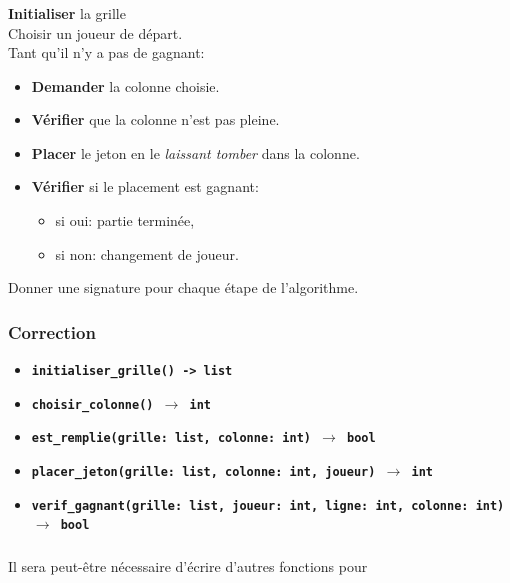 \documentclass[svgnames,11pt]{beamer}
\begin{document}
\begin{frame}
    \frametitle{}
    \textbf{Initialiser} la grille\\
    Choisir un joueur de départ.\\
    Tant qu'il n'y a pas de gagnant:
    \begin{itemize}
        \item \textbf{Demander} la colonne choisie.
        \item \textbf{Vérifier} que la colonne n'est pas pleine.
        \item \textbf{Placer} le jeton en le \emph{laissant tomber} dans la colonne.
        \item \textbf{Vérifier} si le placement est gagnant:
              \begin{itemize}
                  \item si oui: partie terminée,
                  \item si non: changement de joueur.
              \end{itemize}
    \end{itemize}
    \begin{activite}
        Donner une signature pour chaque étape de l'algorithme.
    \end{activite}

\end{frame}
\begin{frame}
    \frametitle{Correction}

    \begin{itemize}
        \item<1-> \textbf{\texttt{initialiser\_grille() -> list}}
        \item<2-> \textbf{\texttt{choisir\_colonne() $\rightarrow$ int}}
        \item<3-> \textbf{\texttt{est\_remplie(grille: list, colonne: int) $\rightarrow$ bool}}
        \item<4-> \textbf{\texttt{placer\_jeton(grille: list, colonne: int, joueur) $\rightarrow$ int}}
        \item<5-> \textbf{\texttt{verif\_gagnant(grille: list, joueur: int, ligne: int, colonne: int) $\rightarrow$ bool}}
    \end{itemize}

\end{frame}
\begin{frame}
    \frametitle{}

    \begin{aretenir}[Remarque]
    Il sera peut-être nécessaire d'écrire d'autres fonctions pour 
    \end{aretenir}

\end{frame}
\end{document}
